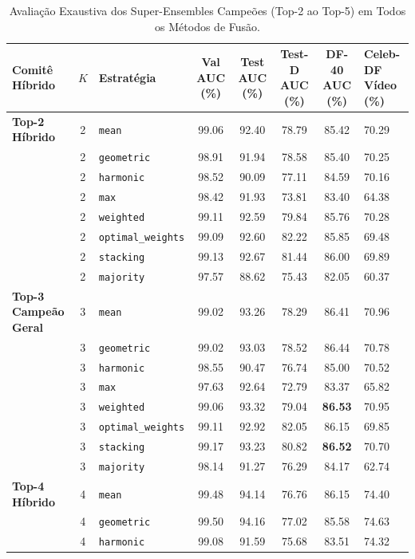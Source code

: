 \begin{table}[t]
\centering
\small
\caption{Avaliação Exaustiva dos Super-Ensembles Campeões (Top-2 ao Top-5) em Todos os Métodos de Fusão.}
\label{tab:hybrid_ensembles_all}
\begin{tabular}{l c l c c c c}
\toprule
\textbf{Comitê Híbrido} & \textbf{$K$} & \textbf{Estratégia} & \textbf{Val AUC (\%)} & \textbf{Test AUC (\%)} & \textbf{Test-D AUC (\%)} & \textbf{DF-40 AUC (\%)} & \textbf{Celeb-DF Vídeo (\%)} \\
\midrule
\textbf{Top-2 Híbrido} & 2 & \texttt{mean} & 99.06 & 92.40 & 78.79 & 85.42 & 70.29 \\
 & 2 & \texttt{geometric} & 98.91 & 91.94 & 78.58 & 85.40 & 70.25 \\
 & 2 & \texttt{harmonic} & 98.52 & 90.09 & 77.11 & 84.59 & 70.16 \\
 & 2 & \texttt{max} & 98.42 & 91.93 & 73.81 & 83.40 & 64.38 \\
 & 2 & \texttt{weighted} & 99.11 & 92.59 & 79.84 & 85.76 & 70.28 \\
 & 2 & \texttt{optimal_weights} & 99.09 & 92.60 & 82.22 & 85.85 & 69.48 \\
 & 2 & \texttt{stacking} & 99.13 & 92.67 & 81.44 & 86.00 & 69.89 \\
 & 2 & \texttt{majority} & 97.57 & 88.62 & 75.43 & 82.05 & 60.37 \\
\midrule
\textbf{Top-3 Campeão Geral} & 3 & \texttt{mean} & 99.02 & 93.26 & 78.29 & 86.41 & 70.96 \\
 & 3 & \texttt{geometric} & 99.02 & 93.03 & 78.52 & 86.44 & 70.78 \\
 & 3 & \texttt{harmonic} & 98.55 & 90.47 & 76.74 & 85.00 & 70.52 \\
 & 3 & \texttt{max} & 97.63 & 92.64 & 72.79 & 83.37 & 65.82 \\
 & 3 & \texttt{weighted} & 99.06 & 93.32 & 79.04 & \textbf{86.53} & 70.95 \\
 & 3 & \texttt{optimal_weights} & 99.11 & 92.92 & 82.05 & 86.15 & 69.85 \\
 & 3 & \texttt{stacking} & 99.17 & 93.23 & 80.82 & \textbf{86.52} & 70.70 \\
 & 3 & \texttt{majority} & 98.14 & 91.27 & 76.29 & 84.17 & 62.74 \\
\midrule
\textbf{Top-4 Híbrido} & 4 & \texttt{mean} & 99.48 & 94.14 & 76.76 & 86.15 & 74.40 \\
 & 4 & \texttt{geometric} & 99.50 & 94.16 & 77.02 & 85.58 & 74.63 \\
 & 4 & \texttt{harmonic} & 99.08 & 91.59 & 75.68 & 83.51 & 74.32 \\

\end{tabular}
\end{table}
